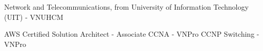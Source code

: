 %
%
%


\begin{scholarship}
					{Network and Telecommunications, from University of Information Technology (UIT) - VNUHCM}
\end{scholarship}

\begin{scholarship}
					{AWS Certified Solution Architect - Associate}
					{CCNA - VNPro}
					{CCNP Switching - VNPro}
\end{scholarship}